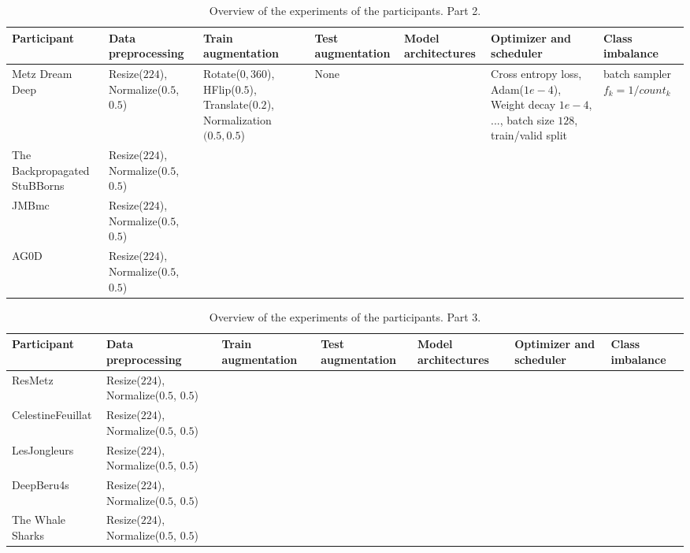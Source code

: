 \documentclass{article}
\begin{document}
{\begin{landscape}
		\begin{table}
			\begin{tabular}{p{3cm}|p{3cm}|p{3cm}|p{3cm}|p{3cm}|p{3cm}|p{3cm}}
			Participant & Data preprocessing & Train augmentation & Test augmentation & Model architectures & Optimizer and scheduler & Class imbalance \\
			\hline
			Metz Dream Deep & 
			Resize($224$), Normalize($0.5$, $0.5$) & 
				Rotate($0, 360$), HFlip($0.5$), Translate($0.2$), Normalization$(0.5, 0.5$)&
			None&
			&
				Cross entropy loss, Adam($1e-4$), Weight decay $1e-4$, ..., batch size $128$, train/valid split&
			batch sampler $f_k=1/count_k$\\
			\hline
			The Backpropagated StuBBorns & 
			Resize($224$), Normalize($0.5$, $0.5$) & 
			&
			&
			&
			&
			\\
			\hline
			JMBmc & 
			Resize($224$), Normalize($0.5$, $0.5$) & 
			&
			&
			&
			&
			\\
			\hline
			AG0D & 
			Resize($224$), Normalize($0.5$, $0.5$) & 
			&
			&
			&
			&
			\\
			\hline
		\end{tabular}
			\caption{Overview of the experiments of the participants. Part 2. \label{table:overview2}}
	\end{table}

		\begin{table}
			\begin{tabular}{p{3cm}|p{3cm}|p{3cm}|p{3cm}|p{3cm}|p{3cm}|p{3cm}}
			Participant & Data preprocessing & Train augmentation & Test augmentation & Model architectures & Optimizer and scheduler & Class imbalance \\
			\hline
			ResMetz & 
			Resize($224$), Normalize($0.5$, $0.5$) & 
			&
			&
			&
			&
			\\
			\hline
			CelestineFeuillat & 
			Resize($224$), Normalize($0.5$, $0.5$) & 
			&
			&
			&
			&
			\\
			\hline
			LesJongleurs & 
			Resize($224$), Normalize($0.5$, $0.5$) & 
			&
			&
			&
			&
			\\
			\hline
			DeepBeru4s & 
			Resize($224$), Normalize($0.5$, $0.5$) & 
			&
			&
			&
			&
			\\
			\hline
			The Whale Sharks & 
			Resize($224$), Normalize($0.5$, $0.5$) & 
			&
			&
			&
			&
			\\
		\end{tabular}
			\caption{Overview of the experiments of the participants. Part 3. \label{table:overview3}}
	\end{table}
	\end{landscape}
	\clearpage
}
\end{document}
